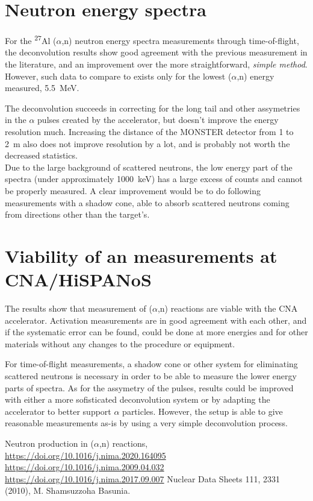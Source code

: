 \documentclass[a4paper,12pt]{report}
\newcommand{\an}{($\alpha$,n) }
\newcommand{\Aliso}{\textsuperscript{27}Al }
\begin{document}
\section{Neutron energy spectra}
For the \Aliso\an neutron energy spectra measurements through time-of-flight, the deconvolution results show good agreement with the previous measurement in the literature, and an improvement over the more straightforward, \textit{simple method}.
However, such data to compare to exists only for the lowest \an energy measured, \qty{5.5}{\MeV}.

The deconvolution succeeds in correcting for the long tail and other assymetries in the $\alpha$ pulses created by the accelerator, but doesn't improve the energy resolution much.
Increasing the distance of the MONSTER detector from 1 to \qty{2}{\m} also does not improve resolution by a lot, and is probably not worth the decreased statistics.
\\

Due to the large background of scattered neutrons, the low energy part of the spectra (under approximately \qty{1000}{\keV}) has a large excess of counts and cannot be properly measured.
A clear improvement would be to do following measurements with a shadow cone, able to absorb scattered neutrons coming from directions other than the target's.

\section{Viability of an measurements at CNA/HiSPANoS}
The results show that measurement of \an reactions are viable with the CNA accelerator.
Activation measurements are in good agreement with each other, and if the systematic error can be found, could be done at more energies and for other materials without any changes to the procedure or equipment.

For time-of-flight measurements, a shadow cone or other system for eliminating scattered neutrons is necessary in order to be able to measure the lower energy parts of spectra.
As for the assymetry of the pulses, results could be improved with either a more sofisticated deconvolution system or by adapting the accelerator to better support $\alpha$ particles.
However, the setup is able to give reasonable measurements as-is by using a very simple deconvolution process.



\begin{thebibliography}{5}
	Neutron production in \an reactions, \url{https://doi.org/10.1016/j.nima.2020.164095}
	\bibitem{}\url{https://doi.org/10.1016/j.nima.2009.04.032}
	\bibitem{}\url{https://doi.org/10.1016/j.nima.2017.09.007}
	Nuclear Data Sheets 111, 2331 (2010), M. Shamsuzzoha Basunia.
\end{thebibliography}
\end{document}
